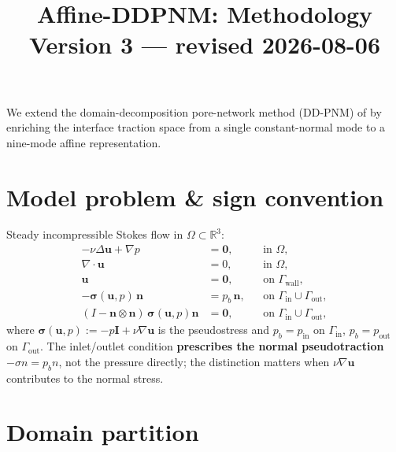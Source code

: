 \documentclass[11pt,a4paper]{article}
\newcommand{\R}{\mathbb{R}}
\newcommand{\dom}{\Omega}
\newcommand{\vel}{\bm{u}}
\newcommand{\pres}{p}
\newcommand{\stress}{\bm{\sigma}}
\newcommand{\normal}{\bm{n}}
\begin{document}
\title{\textbf{Affine-DDPNM: Methodology}\\[4pt]
       \large Version 3 --- revised 2026-08-06}
\author{}
\date{}
\maketitle

We extend the domain-decomposition pore-network method (DD-PNM) of
\cite{sun2025ddpnm} by enriching the interface traction space from a single
constant-normal mode to a nine-mode affine representation.

\section{Model problem \& sign convention}
\label{sec:model}

Steady incompressible Stokes flow in $\dom \subset \R^3$:
\begin{align}
  -\nu\Delta\vel + \nabla\pres &= \bm{0},                && \text{in } \dom,\\
  \nabla\cdot\vel &= 0,                                    && \text{in } \dom,\\
  \vel &= \bm{0},                                          && \text{on } \Gamma_{\text{wall}},\\
  -\stress(\vel,\pres)\,\normal &= p_b\,\normal,          && \text{on } \Gamma_{\text{in}}\cup\Gamma_{\text{out}},\\
  (I-\normal\otimes\normal)\,\stress(\vel,\pres)\normal &= \bm{0},
                                                          && \text{on } \Gamma_{\text{in}}\cup\Gamma_{\text{out}},
\end{align}
where $\stress(\vel,\pres) := -\pres\mathbf{I} + \nu\nabla\vel$ is the
pseudostress and $p_b = p_{\text{in}}$ on $\Gamma_{\text{in}}$,
$p_b = p_{\text{out}}$ on $\Gamma_{\text{out}}$.
The inlet/outlet condition \textbf{prescribes the normal pseudotraction}
$-\sigma n = p_b n$, not the pressure directly; the distinction matters
when $\nu\nabla\vel$ contributes to the normal stress.

\section{Domain partition}
\label{sec:partition}
\end{document}
